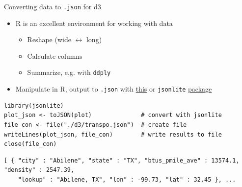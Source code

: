 \documentclass[sans,aspectratio=169,presentation,bigger,fleqn]{beamer}
\begin{document}
\begin{frame}[fragile,label=sec-30]{Converting data to \texttt{.json} for d3}
 \begin{itemize}
\item R is an excellent environment for working with data
\begin{itemize}
\item Reshape (wide \(\leftrightarrow\) long)
\item Calculate columns
\item Summarize, e.g. with \texttt{ddply}
\end{itemize}
\item Manipulate in R, output to \texttt{.json} with \href{http://theweiluo.wordpress.com/2011/09/30/r-to-json-for-d3-js-and-protovis/}{this} or \texttt{jsonlite} \href{http://cran.r-project.org/web/packages/jsonlite/}{package}
\end{itemize}

\scriptsize
\begin{verbatim}
library(jsonlite)
plot_json <- toJSON(plot)              # convert with jsonlite
file_con <- file("./d3/transpo.json")  # create file
writeLines(plot_json, file_con)        # write results to file
close(file_con)
\end{verbatim}
\normalsize

\scriptsize
\begin{verbatim}
[ { "city" : "Abilene", "state" : "TX", "btus_pmile_ave" : 13574.1, "density" : 2547.39,
    "lookup" : "Abilene, TX", "lon" : -99.73, "lat" : 32.45 }, ...
\end{verbatim}
\normalsize
\end{frame}
\end{document}
